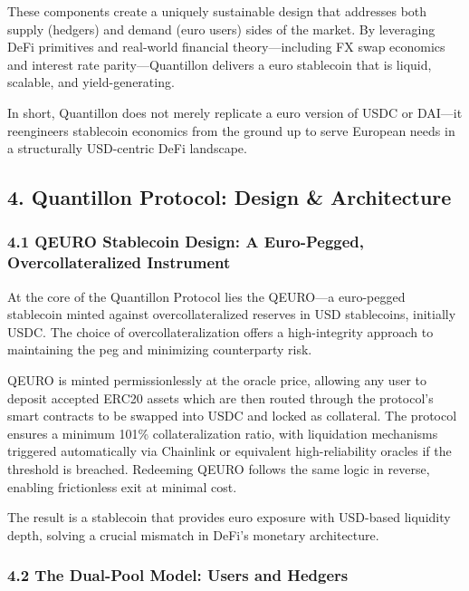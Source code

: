 These components create a uniquely sustainable design that addresses
both supply (hedgers) and demand (euro users) sides of the market. By
leveraging DeFi primitives and real-world financial theory---including
FX swap economics and interest rate parity---Quantillon delivers a euro
stablecoin that is liquid, scalable, and yield-generating.

In short, Quantillon does not merely replicate a euro version of USDC or
DAI---it reengineers stablecoin economics from the ground up to serve
European needs in a structurally USD-centric DeFi landscape.

\hypertarget{quantillon-protocol-design-architecture}{%
\subsection{4. Quantillon Protocol: Design \&
Architecture}\label{quantillon-protocol-design-architecture}}

\hypertarget{qeuro-stablecoin-design-a-euro-pegged-overcollateralized-instrument}{%
\subsubsection{4.1 QEURO Stablecoin Design: A Euro-Pegged,
Overcollateralized
Instrument}\label{qeuro-stablecoin-design-a-euro-pegged-overcollateralized-instrument}}

At the core of the Quantillon Protocol lies the QEURO---a euro-pegged
stablecoin minted against overcollateralized reserves in USD
stablecoins, initially USDC. The choice of overcollateralization offers
a high-integrity approach to maintaining the peg and minimizing
counterparty risk.

QEURO is minted permissionlessly at the oracle price, allowing any user
to deposit accepted ERC20 assets which are then routed through the
protocol's smart contracts to be swapped into USDC and locked as
collateral. The protocol ensures a minimum 101\% collateralization
ratio, with liquidation mechanisms triggered automatically via Chainlink
or equivalent high-reliability oracles if the threshold is breached.
Redeeming QEURO follows the same logic in reverse, enabling frictionless
exit at minimal cost.

The result is a stablecoin that provides euro exposure with USD-based
liquidity depth, solving a crucial mismatch in DeFi's monetary
architecture.

\hypertarget{the-dual-pool-model-users-and-hedgers}{%
\subsubsection{4.2 The Dual-Pool Model: Users and
Hedgers}\label{the-dual-pool-model-users-and-hedgers}}

